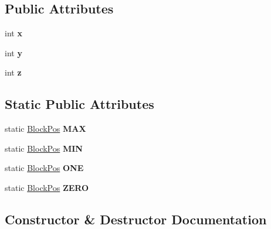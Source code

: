 \subsection*{Public Attributes}
\begin{DoxyCompactItemize}
\item 
\mbox{\label{struct_block_pos_a1e849928455d0a6d25721e6b1b0a8876}} 
int {\bfseries x}
\item 
\mbox{\label{struct_block_pos_a8fecb26a7754517f788266cf6c84451f}} 
int {\bfseries y}
\item 
\mbox{\label{struct_block_pos_ac4a24c2399b094333db300e57c28cb19}} 
int {\bfseries z}
\end{DoxyCompactItemize}
\subsection*{Static Public Attributes}
\begin{DoxyCompactItemize}
\item 
\mbox{\label{struct_block_pos_a843b84125eefee7c52850410a388627d}} 
static \mbox{\hyperlink{struct_block_pos}{Block\+Pos}} {\bfseries M\+AX}
\item 
\mbox{\label{struct_block_pos_a8ed59114fba912732be18dca48868e4d}} 
static \mbox{\hyperlink{struct_block_pos}{Block\+Pos}} {\bfseries M\+IN}
\item 
\mbox{\label{struct_block_pos_ae3d869e3c882239431e8915facc20356}} 
static \mbox{\hyperlink{struct_block_pos}{Block\+Pos}} {\bfseries O\+NE}
\item 
\mbox{\label{struct_block_pos_a3e08acfc8413bb19a03e84789eea1d8a}} 
static \mbox{\hyperlink{struct_block_pos}{Block\+Pos}} {\bfseries Z\+E\+RO}
\end{DoxyCompactItemize}


\subsection{Constructor \& Destructor Documentation}
\mbox{\label{struct_block_pos_a5c5ac9cc1e63d3ec8514b1cb82d6ff21}} 
